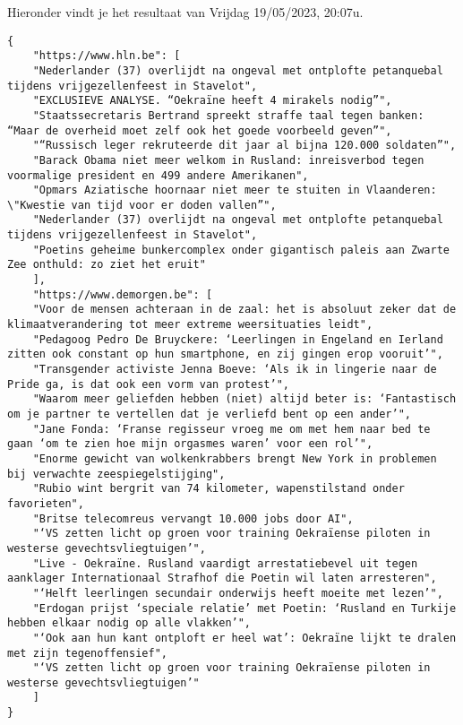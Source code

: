 Hieronder vindt je het resultaat van Vrijdag 19/05/2023, 20:07u.
\begin{listing}[H]
    \begin{verbatim}
{
    "https://www.hln.be": [
    "Nederlander (37) overlijdt na ongeval met ontplofte petanquebal tijdens vrijgezellenfeest in Stavelot",
    "EXCLUSIEVE ANALYSE. “Oekraïne heeft 4 mirakels nodig”",
    "Staatssecretaris Bertrand spreekt straffe taal tegen banken: “Maar de overheid moet zelf ook het goede voorbeeld geven”",
    "“Russisch leger rekruteerde dit jaar al bijna 120.000 soldaten”",
    "Barack Obama niet meer welkom in Rusland: inreisverbod tegen voormalige president en 499 andere Amerikanen",
    "Opmars Aziatische hoornaar niet meer te stuiten in Vlaanderen: \"Kwestie van tijd voor er doden vallen”",
    "Nederlander (37) overlijdt na ongeval met ontplofte petanquebal tijdens vrijgezellenfeest in Stavelot",
    "Poetins geheime bunkercomplex onder gigantisch paleis aan Zwarte Zee onthuld: zo ziet het eruit"
    ],
    "https://www.demorgen.be": [
    "Voor de mensen achteraan in de zaal: het is absoluut zeker dat de klimaatverandering tot meer extreme weersituaties leidt",
    "Pedagoog Pedro De Bruyckere: ‘Leerlingen in Engeland en Ierland zitten ook constant op hun smartphone, en zij gingen erop vooruit’",
    "Transgender activiste Jenna Boeve: ‘Als ik in lingerie naar de Pride ga, is dat ook een vorm van protest’",
    "Waarom meer geliefden hebben (niet) altijd beter is: ‘Fantastisch om je partner te vertellen dat je verliefd bent op een ander’",
    "Jane Fonda: ‘Franse regisseur vroeg me om met hem naar bed te gaan ‘om te zien hoe mijn orgasmes waren’ voor een rol’",
    "Enorme gewicht van wolkenkrabbers brengt New York in problemen bij verwachte zeespiegelstijging",
    "Rubio wint bergrit van 74 kilometer, wapenstilstand onder favorieten",
    "Britse telecomreus vervangt 10.000 jobs door AI",
    "‘VS zetten licht op groen voor training Oekraïense piloten in westerse gevechtsvliegtuigen’",
    "Live - Oekraïne. Rusland vaardigt arrestatiebevel uit tegen aanklager Internationaal Strafhof die Poetin wil laten arresteren",
    "‘Helft leerlingen secundair onderwijs heeft moeite met lezen’",
    "Erdogan prijst ‘speciale relatie’ met Poetin: ‘Rusland en Turkije hebben elkaar nodig op alle vlakken’",
    "‘Ook aan hun kant ontploft er heel wat’: Oekraïne lijkt te dralen met zijn tegenoffensief",
    "‘VS zetten licht op groen voor training Oekraïense piloten in westerse gevechtsvliegtuigen’"
    ]
}

    \end{verbatim}
    \label{bijlage:json-input}
\end{listing}

